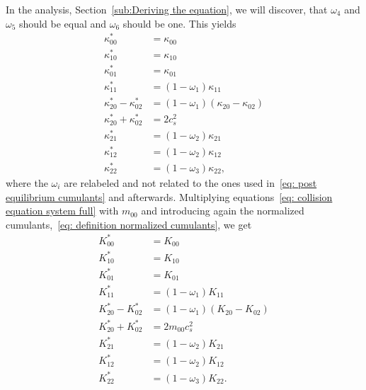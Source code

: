 In the analysis, Section~\ref{sub:Deriving the equation}, we will discover, that $\omega_4$ and $\omega_5$ should be equal and $\omega_6$ should be one.
This yields
\begin{equation}
  \label{eq: collision equation system full}
  \begin{aligned}
    \kappa_{00}^{*} & = \kappa_{00} \\
    \kappa_{10}^{*} & = \kappa_{10} \\
    \kappa_{01}^{*} & = \kappa_{01} \\
    \kappa_{11}^{*} & = (1-\omega_1)\kappa_{11} \\
    \kappa_{20}^{*} - \kappa_{02}^{*}
      & = (1-\omega_1) (\kappa_{20} - \kappa_{02}) \\
    \kappa_{20}^{*} + \kappa_{02}^{*}
      & = 2 c_s^2 \\
    \kappa_{21}^{*} & = (1-\omega_2)\kappa_{21} \\
    \kappa_{12}^{*} & = (1-\omega_2)\kappa_{12} \\
    \kappa_{22}^{*} & = (1-\omega_3)\kappa_{22},
  \end{aligned}
\end{equation}
where the $\omega_i$ are relabeled and not related to the ones used in~\eqref{eq: post equilibrium cumulants} and afterwards.
Multiplying equations~\eqref{eq: collision equation system full} with $m_{00}$ and introducing again the normalized cumulants,~\eqref{eq: definition normalized cumulants}, we get
\begin{equation}
  \label{eq: final collision all relaxations}
  \begin{aligned}
    K_{00}^{*} & = K_{00} \\
    K_{10}^{*} & = K_{10} \\
    K_{01}^{*} & = K_{01} \\
    K_{11}^{*} & = (1-\omega_1)K_{11} \\
    K_{20}^{*} - K_{02}^{*} & = (1-\omega_1) (K_{20} - K_{02}) \\
    K_{20}^{*} + K_{02}^{*} & = 2 m_{00} c_s^2 \\
    K_{21}^{*} & = (1-\omega_2)K_{21} \\
    K_{12}^{*} & = (1-\omega_2)K_{12} \\
    K_{22}^{*} & = (1-\omega_3)K_{22}.
  \end{aligned}
\end{equation}
